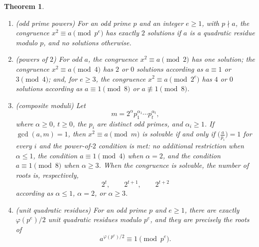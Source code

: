 \documentclass[11pt]{article}
\theoremstyle{ntstyle}
\newtheorem{theorem}{Theorem}[subsection]
\newcommand{\statementlist}{\mbox{}}
\newcommand{\legs}[2]{\bigl(\tfrac{#1}{#2}\bigr)}
\begin{document}
\begin{theorem}\label{thm:7.8.4}\statementlist

  \begin{enumerate}[label={\alph*)}]
    \item (odd prime powers) For an odd prime $p$ and an integer $e\ge1$,
          with $p\nmid a$, the congruence
          $x^2\equiv a\pmod{p^e}$ has exactly $2$ solutions if $a$ is a
          quadratic residue modulo $p$, and no solutions otherwise.
    \item (powers of $2$) For odd $a$, the congruence
          $x^2\equiv a\pmod{2}$ has one solution;
          the congruence $x^2\equiv a\pmod{4}$ has $2$ or $0$ solutions according as
          $a\equiv1$ or $3\pmod{4}$; and, for $e\ge3$,
          the congruence $x^2\equiv a\pmod{2^e}$ has $4$ or $0$ solutions according as
          $a\equiv1\pmod{8}$ or $a\not\equiv1\pmod{8}$.
    \item (composite moduli) Let
          \[
            m=2^\alpha p_1^{\alpha_1}\cdots p_t^{\alpha_t},
          \]
          where $\alpha\ge0$, $t\ge0$, the $p_i$ are distinct odd primes, and
          $\alpha_i\ge1$. If $\gcd(a,m)=1$, then
          $x^2\equiv a\pmod{m}$ is solvable if and only if
          $\legs{a}{p_i}=1$ for every $i$ and the power-of-$2$ condition is met:
          no additional restriction when $\alpha\le1$,
          the condition $a\equiv1\pmod{4}$ when $\alpha=2$, and
          the condition $a\equiv1\pmod{8}$ when $\alpha\ge3$. When the congruence is solvable, the number
          of roots is, respectively,
          \[
            2^t,\qquad 2^{t+1},\qquad 2^{t+2}
          \]
          according as $\alpha\le1$, $\alpha=2$, or $\alpha\ge3$.
    \item (unit quadratic residues) For an odd prime $p$ and
          $e\ge1$, there are exactly $\varphi(p^e)/2$ unit quadratic
          residues modulo $p^e$, and they are precisely the roots of
          \[
            a^{\varphi(p^e)/2}\equiv1\pmod{p^e}.
          \]
  \end{enumerate}

\end{theorem}
\end{document}
